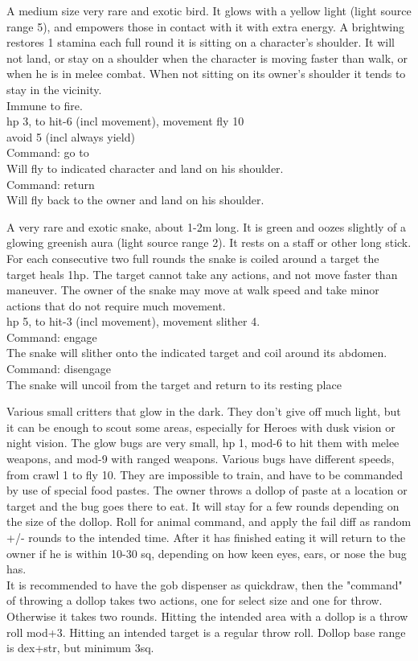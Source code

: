 A medium size very rare and exotic bird. It glows with a yellow light (light source range 5), and empowers those in contact with it with extra energy. A brightwing restores 1 stamina each full round it is sitting on a character's shoulder. It will not land, or stay on a shoulder when the character is moving faster than walk, or when he is in melee combat. When not sitting on its owner's shoulder it tends to stay in the vicinity. \\
Immune to fire. \\
hp 3, to hit-6 (incl movement), movement fly 10 \\
avoid 5 (incl always yield) \\
Command: go to \\
Will fly to indicated character and land on his shoulder. \\
Command: return \\
Will fly back to the owner and land on his shoulder.


A very rare and exotic snake, about 1-2m long. It is green and oozes slightly of a glowing greenish aura (light source range 2). It rests on a staff or other long stick. For each consecutive two full rounds the snake is coiled around a target the target heals 1hp. The target cannot take any actions, and not move faster than maneuver. The owner of the snake may move at walk speed and take minor actions that do not require much movement. \\
hp 5, to hit-3 (incl movement), movement slither 4. \\
Command: engage \\
The snake will slither onto the indicated target and coil around its abdomen.
Command: disengage \\
The snake will uncoil from the target and return to its resting place


Various small critters that glow in the dark. They don't give off much light, but it can be enough to scout some areas, especially for Heroes with dusk vision or night vision. The glow bugs are very small, hp 1, mod-6 to hit them with melee weapons, and mod-9 with ranged weapons. Various bugs have different speeds, from crawl 1 to fly 10. They are impossible to train, and have to be commanded by use of special food pastes. The owner throws a dollop of paste at a location or target and the bug goes there to eat. It will stay for a few rounds depending on the size of the dollop. Roll for animal command, and apply the fail diff as random +/- rounds to the intended time. After it has finished eating it will return to the owner if he is within 10-30 sq, depending on how keen eyes, ears, or nose the bug has. \\
It is recommended to have the gob dispenser as quickdraw, then the "command" of throwing a dollop takes two actions, one for select size and one for throw. Otherwise it takes two rounds. Hitting the intended area with a dollop is a throw roll mod+3. Hitting an intended target is a regular throw roll. Dollop base range is dex+str, but minimum 3sq.


